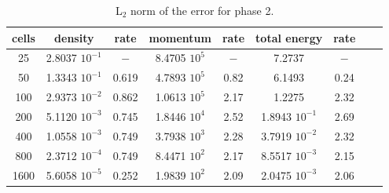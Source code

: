 \documentclass[preprint,10pt]{elsarticle}
\begin{document}
%
\begin{table}[H]
\begin{center}
 \caption{\label{tbl:l2-norm-indp-phase-2} L$_2$ norm of the error for phase 2.}
 \begin{tabular}{|c|c|c|c|c|c|c|c|c|}
 \hline
cells& density            & rate & momentum          & rate & total energy           & rate \\ \hline
25      & 2.8037 $10^{-1}$ & $-$    & 8.4705 $10^{5}$ & $-$     & 7.2737           & $-$      \\ \hline
50      & 1.3343 $10^{-1}$ & 0.619 & 4.7893 $10^{5}$ & 0.82 & 6.1493           & 0.24 \\ \hline
100    & 2.9373 $10^{-2}$ & 0.862 & 1.0613 $10^{5}$ & 2.17  & 1.2275           & 2.32   \\ \hline
200    & 5.1120 $10^{-3}$ & 0.745 & 1.8446 $10^{4}$ & 2.52  & 1.8943 $10^{-1}$ & 2.69   \\ \hline
400    & 1.0558 $10^{-3}$ & 0.749 & 3.7938 $10^{3}$ & 2.28  & 3.7919 $10^{-2}$ & 2.32   \\ \hline
800    & 2.3712 $10^{-4}$ & 0.749 & 8.4471 $10^{2}$ & 2.17  & 8.5517 $10^{-3}$ & 2.15   \\ \hline
1600  & 5.6058 $10^{-5}$ & 0.252 & 1.9839 $10^{2}$ & 2.09  & 2.0475 $10^{-3}$ & 2.06   \\ \hline
\end{tabular}
\end{center}
\end{table}
%
%
%
%
%
%
%
%
%
%
%
%
%
%
%
%
%
%
\end{document}
